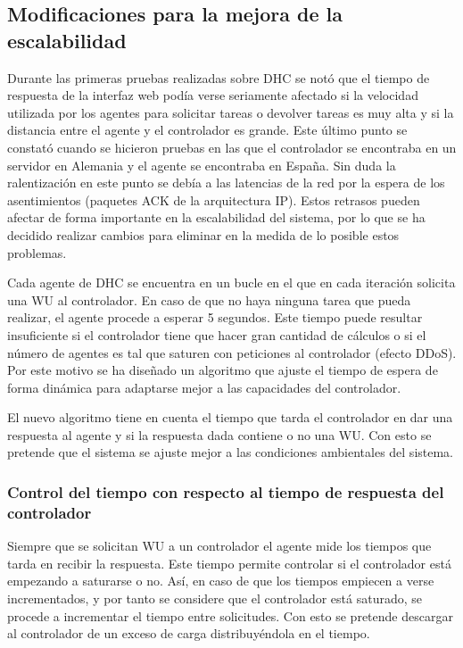 \subsection{Modificaciones para la mejora de la escalabilidad}

Durante las primeras pruebas realizadas sobre DHC se notó que el tiempo de respuesta de la interfaz web podía verse seriamente afectado si la velocidad utilizada por los agentes para solicitar tareas o devolver tareas es muy alta y si la distancia entre el agente y el controlador es grande. Este último punto se constató cuando se hicieron pruebas en las que el controlador se encontraba en un servidor en Alemania y el agente se encontraba en España. Sin duda la ralentización en este punto se debía a las latencias de la red por la espera de los asentimientos (paquetes ACK de la arquitectura IP). Estos retrasos pueden afectar de forma importante en la escalabilidad del sistema, por lo que se ha decidido realizar cambios para eliminar en la medida de lo posible estos problemas.

Cada agente de DHC se encuentra en un bucle en el que en cada iteración solicita una WU al controlador. En caso de que no haya ninguna tarea que pueda realizar, el agente procede a esperar 5 segundos. Este tiempo puede resultar insuficiente si el controlador tiene que hacer gran cantidad de cálculos o si el número de agentes es tal que saturen con peticiones al controlador (efecto DDoS). Por este motivo se ha diseñado un algoritmo que ajuste el tiempo de espera de forma dinámica para adaptarse mejor a las capacidades del controlador.

El nuevo algoritmo tiene en cuenta el tiempo que tarda el controlador en dar una respuesta al agente y si la respuesta dada contiene o no una WU. Con esto se pretende que el sistema se ajuste mejor a las condiciones ambientales del sistema.

\subsubsection{Control del tiempo con respecto al tiempo de respuesta del controlador}

Siempre que se solicitan WU a un controlador el agente mide los tiempos que tarda en recibir la respuesta. Este tiempo permite controlar si el controlador está empezando a saturarse o no. Así, en caso de que los tiempos empiecen a verse incrementados, y por tanto se considere que el controlador está saturado, se procede a incrementar el tiempo entre solicitudes. Con esto se pretende descargar al controlador de un exceso de carga distribuyéndola en el tiempo.

